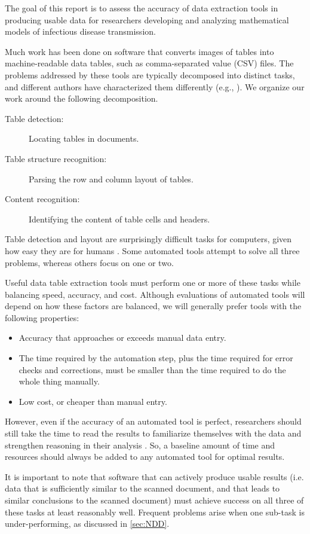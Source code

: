 \documentclass[12pt]{article}
\begin{document}
The goal of this report is to assess the accuracy of data extraction tools in producing usable data for researchers developing and analyzing mathematical models of infectious disease transmission.

Much work has been done on software that converts images of tables into machine-readable data tables, such as comma-separated value (CSV) files. The problems addressed by these tools are typically decomposed into distinct tasks, and different authors have characterized them differently (e.g., \cite{zhong2020image}). We organize our work around the following decomposition.
\begin{description}
    \item[Table detection:] Locating tables in documents.
    \item[Table structure recognition:] Parsing the row and column layout of tables.
    \item[Content recognition:] Identifying the content of table cells and headers.
\end{description}

Table detection and layout are surprisingly difficult tasks for computers, given how easy they are for humans \cite{hu2002evaluating}. Some automated tools attempt to solve all three problems, whereas others focus on one or two.

Useful data table extraction tools must perform one or more of these tasks while balancing speed, accuracy, and cost. Although evaluations of automated tools will depend on how these factors are balanced, we will generally prefer tools with the following properties:
\begin{itemize}
    \item Accuracy that approaches or exceeds manual data entry.
    \item The time required by the automation step, plus the time required for error checks and corrections, must be smaller than the time required to do the whole thing manually.
    \item Low cost, or cheaper than manual entry.
\end{itemize}
However, even if the accuracy of an automated tool is perfect, researchers should still take the time to read the results to familiarize themselves with the data and strengthen reasoning in their analysis \cite{STADLER2024108386}. So, a baseline amount of time and resources should always be added to any automated tool for optimal results.

It is important to note that software that can actively produce usable results (i.e. data that is sufficiently similar to the scanned document, and that leads to similar conclusions to the scanned document) must achieve success on all three of these tasks at least reasonably well. Frequent problems arise when one sub-task is under-performing, as discussed in \cref{sec:NDD}.
\end{document}

